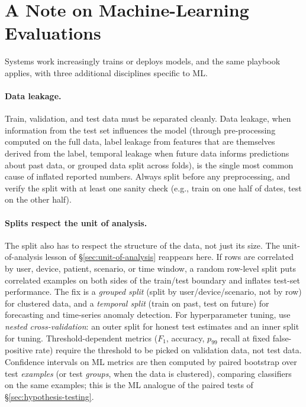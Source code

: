 \documentclass[11pt]{article}
\begin{document}
\section{A Note on Machine-Learning Evaluations}
\label{sec:ml}

Systems work increasingly trains or deploys models, and the same playbook applies, with three additional disciplines specific to ML.

\paragraph{Data leakage.} Train, validation, and test data must be separated cleanly. Data leakage, when information from the test set influences the model (through pre-processing computed on the full data, label leakage from features that are themselves derived from the label, temporal leakage when future data informs predictions about past data, or grouped data split across folds), is the single most common cause of inflated reported numbers. Always split before any preprocessing, and verify the split with at least one sanity check (e.g., train on one half of dates, test on the other half).

\paragraph{Splits respect the unit of analysis.} The split also has to respect the structure of the data, not just its size. The unit-of-analysis lesson of \S\ref{sec:unit-of-analysis} reappears here. If rows are correlated by user, device, patient, scenario, or time window, a random row-level split puts correlated examples on both sides of the train/test boundary and inflates test-set performance. The fix is a \emph{grouped split} (split by user/device/scenario, not by row) for clustered data, and a \emph{temporal split} (train on past, test on future) for forecasting and time-series anomaly detection. For hyperparameter tuning, use \emph{nested cross-validation}: an outer split for honest test estimates and an inner split for tuning. Threshold-dependent metrics ($F_1$, accuracy, $p_{99}$ recall at fixed false-positive rate) require the threshold to be picked on validation data, not test data. Confidence intervals on ML metrics are then computed by paired bootstrap over test \emph{examples} (or test \emph{groups}, when the data is clustered), comparing classifiers on the same examples; this is the ML analogue of the paired tests of \S\ref{sec:hypothesis-testing}.
\end{document}

